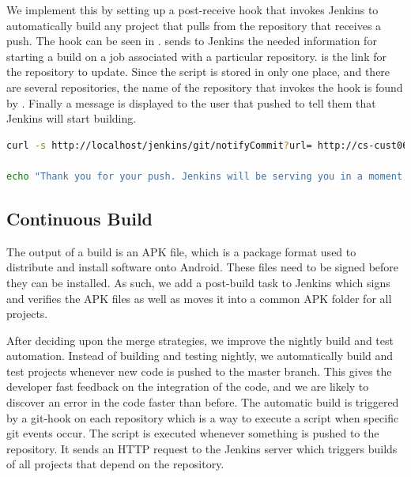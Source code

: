 We implement this by setting up a post-receive hook that invokes Jenkins to automatically build any project that pulls from the repository that receives a push. The hook can be seen in .  sends to Jenkins the needed information for starting a build on a job associated with a particular repository.  is the link for the repository to update. Since the script is stored in only one place, and there are several repositories, the name of the repository that invokes the hook is found by . Finally a message is displayed to the user that pushed to tell them that Jenkins will start building.

\begin{lstlisting}[language=bash,showstringspaces=false,caption=Git hook script,label=lst:hook_script_first]
curl -s http://localhost/jenkins/git/notifyCommit?url= http://cs-cust06-int.cs.aau.dk/git-ro/$(basename $(pwd)) > /dev/null

echo "Thank you for your push. Jenkins will be serving you in a moment."
\end{lstlisting}

\subsection{Continuous Build}
The output of a build is an APK file, which is a package format used to distribute and install software onto Android. These files need to be signed before they can be installed. As such, we add a post-build task to Jenkins which signs and verifies the APK files as well as moves it into a common APK folder for all projects.

After deciding upon the merge strategies, we improve the nightly build and test automation. Instead of building and testing nightly, we automatically build and test projects whenever new code is pushed to the master branch. This gives the developer fast feedback on the integration of the code, and we are likely to discover an error in the code faster than before. The automatic build is triggered by a git-hook on each repository which is a way to execute a script when specific git events occur. The script is executed whenever something is pushed to the repository. It sends an HTTP request to the Jenkins server which triggers builds of all projects that depend on the repository.
